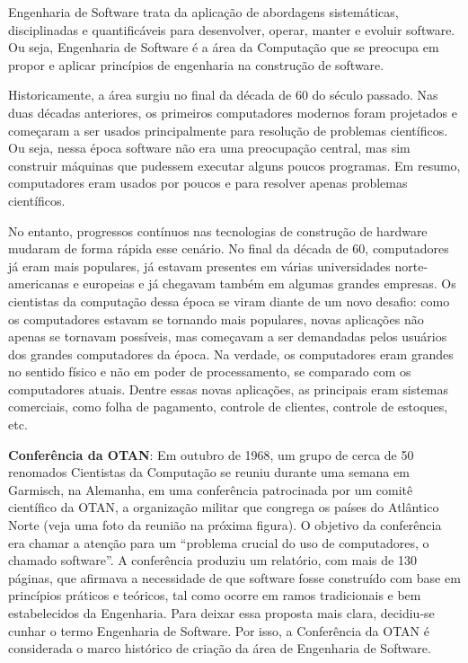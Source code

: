 \documentclass[
  11pt,
  twoside]{book}
\begin{document}
Engenharia de Software trata da aplicação de abordagens sistemáticas,
disciplinadas e quantificáveis para desenvolver, operar, manter e
evoluir software. Ou seja, Engenharia de Software é a área da Computação
que se preocupa em propor e aplicar princípios de engenharia na
construção de software.

Historicamente, a área surgiu no final da década de 60 do século
passado. Nas duas décadas anteriores, os primeiros computadores modernos
foram projetados e começaram a ser usados principalmente para resolução
de problemas científicos. Ou seja, nessa época software não era uma
preocupação central, mas sim construir máquinas que pudessem executar
alguns poucos programas. Em resumo, computadores eram usados por poucos
e para resolver apenas problemas científicos.

No entanto, progressos contínuos nas tecnologias de construção de
hardware mudaram de forma rápida esse cenário. No final da década de 60,
computadores já eram mais populares, já estavam presentes em várias
universidades norte-americanas e europeias e já chegavam também em
algumas grandes empresas. Os cientistas da computação dessa época se
viram diante de um novo desafio: como os computadores estavam se
tornando mais populares, novas aplicações não apenas se tornavam
possíveis, mas começavam a ser demandadas pelos usuários dos grandes
computadores da época. Na verdade, os computadores eram grandes no
sentido físico e não em poder de processamento, se comparado com os
computadores atuais. Dentre essas novas aplicações, as principais eram
sistemas comerciais, como folha de pagamento, controle de clientes,
controle de estoques, etc.

 \textbf{Conferência da OTAN}: Em outubro de
1968, um grupo de cerca de 50 renomados Cientistas da Computação se
reuniu durante uma semana em Garmisch, na Alemanha, em uma conferência
patrocinada por um comitê científico da OTAN, a organização militar que
congrega os países do Atlântico Norte (veja uma foto da reunião na
próxima figura). O objetivo da conferência era chamar a atenção para um
``problema crucial do uso de computadores, o chamado software''. A
conferência produziu um relatório, com mais de 130 páginas, que afirmava
a necessidade de que software fosse construído com base em princípios
práticos e teóricos, tal como ocorre em ramos tradicionais e bem
estabelecidos da Engenharia. Para deixar essa proposta mais clara,
decidiu-se cunhar o termo Engenharia de Software. Por isso, a
Conferência da OTAN é considerada o marco histórico de criação da área
de Engenharia de Software.
\end{document}
